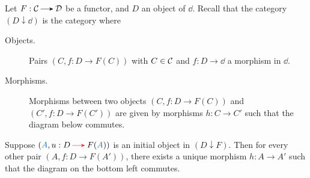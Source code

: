     \begin{prf}
        Let $F: \cc \to \dd$ be a functor, and $D$ an object of $\dd$. Recall that 
        the category $(D \downarrow \dd)$ is the category where 
        \begin{description}
            \item[Objects.] Pairs $(C, f: D \to F(C))$ with $C \in \mathcal{C}$ and $f: D \to \dd$ a morphism in $\dd$. 
            \item[Morphisms.] Morphisms between two objects $(C, f: D \to F(C))$ and $(C', f: D \to F(C'))$ 
            are given by morphisms $h: C \to C'$ such that the diagram below commutes. 
            \begin{center}
            \end{center}
        \end{description}
        Suppose $(\textcolor{NavyBlue}{A}, u: D \mathbin{\textcolor{Red}{\to}} F(\textcolor{NavyBlue}{A}))$ is an initial object in $(D \downarrow F)$. Then for every 
        other pair $(A, f: D \to F(A'))$, there exists a unique morphism $h: A \to A'$ 
        such that the diagram on the bottom left commutes. 
        \begin{center}
            \raisebox{0.5cm}{$=$}

\end{center}
\end{prf}

